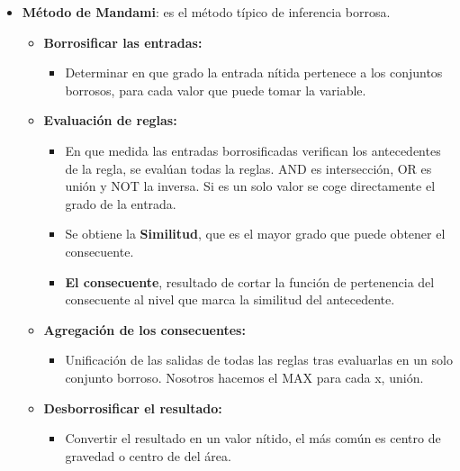 \documentclass[12pt, twoside, openright]{report} %
\begin{document}
\begin{itemize}
    \begin{itemize}
    \item \textbf{Método de Mandami}: es el método típico de inferencia
      borrosa.
      

      \begin{itemize}
      \item \textbf{Borrosificar las entradas:}
        

        \begin{itemize}
        \item Determinar en que grado la entrada nítida pertenece a los
          conjuntos borrosos, para cada valor que puede tomar la
          variable.
          
        \end{itemize}
      \item \textbf{Evaluación de reglas:}
        

        \begin{itemize}
        \item En que medida las entradas borrosificadas verifican los
          antecedentes de la regla, se evalúan todas la reglas. AND es
          intersección, OR es unión y NOT la inversa. Si es un solo
          valor se coge directamente el grado de la entrada.
          
        \item Se obtiene la \textbf{Similitud}, que es el mayor grado que
          puede obtener el consecuente.
          
        \item \textbf{El consecuente}, resultado de cortar la función de
          pertenencia del consecuente al nivel que marca la similitud
          del antecedente.
          
        \end{itemize}
      \item \textbf{Agregación de los consecuentes:}
        

        \begin{itemize}
        \item Unificación de las salidas de todas las reglas tras evaluarlas
          en un solo conjunto borroso. Nosotros hacemos el MAX para cada
          x, unión.
          
        \end{itemize}
      \item \textbf{Desborrosificar el resultado:}
        

        \begin{itemize}
        \item Convertir el resultado en un valor nítido, el más común es
          centro de gravedad o centro de del área.
          
        \end{itemize}
      \end{itemize}
    \end{itemize}
  \end{itemize}




\end{document}

